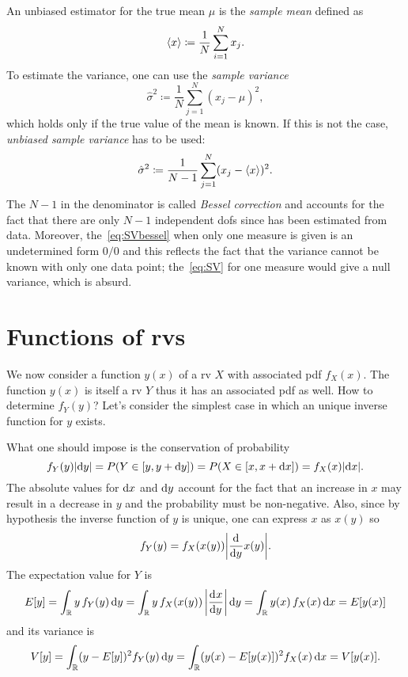 An unbiased estimator for the true mean $\mu$ is the \emph{sample mean} defined as
\begin{equation}\label{eq:SV}
	\mean{x} \coloneqq \frac{1}{N}\sum_{i=1}^N x_j.
\end{equation}
To estimate the variance, one can use the \emph{sample variance}
\begin{equation}
	\hat \sigma^2 \coloneqq \frac{1}{N}\sum_{j=1}^N(x_j - \mu)^2,
\end{equation}
which holds only if the true value of the mean is known.
If this is not the case, \emph{unbiased sample variance} has to be used:
\begin{equation}\label{eq:SVbessel}
	\hat\sigma^2 \coloneqq \frac{1}{N-1}\sum_{j=1}^N(x_j - \mean{x})^2.
\end{equation}
The $N-1$ in the denominator is called \emph{Bessel correction} and accounts for the fact that there are only $N-1$ independent \acsp{dof} since  has been estimated from data.
Moreover, the~\eqref{eq:SVbessel} when only one measure is given is an undetermined form $0/0$ and this reflects the fact that the variance cannot be known with only one data point; the~\eqref{eq:SV} for one measure would give a null variance, which is absurd.

\section{Functions of \acsp{rv}}

We now consider a function $y(x)$ of a \ac{rv} $X$ with associated \ac{pdf} $f_X(x)$.
The function $y(x)$ is itself a \ac{rv} $Y$ thus it has an associated \ac{pdf} as well.
How to determine $f_Y(y)$?
Let's consider the simplest case in which an unique inverse function for $y$ exists.


What one should impose is the conservation of probability
\begin{equation}
	f_Y(y)\abs{\ud y} = P(Y\in[y,y+\ud y]) = P( X\in[x,x+\ud x]) = f_X(x)\abs{\ud x}.
\end{equation}
The absolute values for $\ud x$ and $\ud y$ account for the fact that an increase in $x$ may result in a decrease in $y$ and the probability must be non-negative.
Also, since by hypothesis the inverse function of $y$ is unique, one can express $x$ as $x(y)$ so
\begin{equation}
	f_Y(y) = f_X(x(y))\abs[\bigg]{\deriv{}{y}x(y)}.
\end{equation}
The expectation value for $Y$ is 
\begin{equation}
	E[y] =
	\int_\R y\,f_Y(y)\ud y =
	\int_\R y\,f_X(x(y))\,\abs[\bigg]{\deriv{x}{y}}\ud y
	= \int_\R y(x)\,f_X(x)\ud x
	= E[y(x)]
\end{equation}
and its variance is
\begin{equation}
	V[y] %
	= \int_\R (y-E[y])^2 f_Y(y)\ud y
	=\int_\R (y(x)-E[y(x)])^2 f_X(x)\ud x
	= V[y(x)].
\end{equation}

